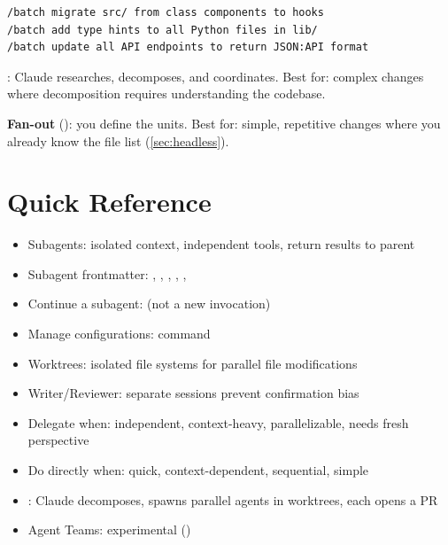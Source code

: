 \begin{verbatim}
/batch migrate src/ from class components to hooks
/batch add type hints to all Python files in lib/
/batch update all API endpoints to return JSON:API format
\end{verbatim}

\begin{decisionbox}
\textbf{}: Claude researches, decomposes, and coordinates.
Best for: complex changes where decomposition requires understanding the codebase.

\textbf{Fan-out} (): you define the units.
Best for: simple, repetitive changes where you already know the file list
(\cref{sec:headless}).
\end{decisionbox}


\section{Quick Reference}

\begin{itemize}
  \item Subagents: isolated context, independent tools, return results to parent
  \item Subagent frontmatter: , , , , , 
  \item Continue a subagent:  (not a new  invocation)
  \item Manage configurations:  command
  \item Worktrees: isolated file systems for parallel file modifications
  \item Writer/Reviewer: separate sessions prevent confirmation bias
  \item Delegate when: independent, context-heavy, parallelizable, needs fresh perspective
  \item Do directly when: quick, context-dependent, sequential, simple
  \item {}: Claude decomposes, spawns parallel agents in worktrees, each opens a PR
  \item Agent Teams: experimental ()
\end{itemize}


